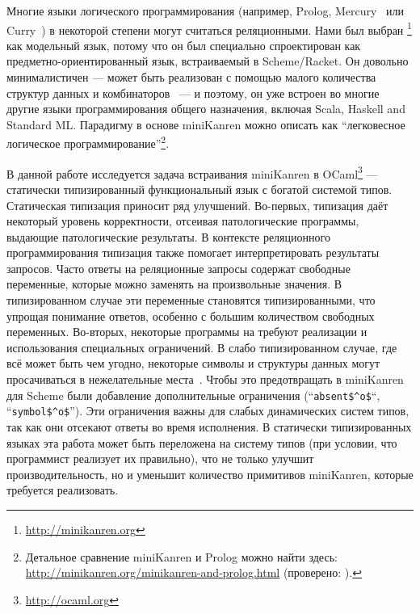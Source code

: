 Многие языки логического программирования (например, Prolog, Mercury~\cite{MercuryFirstPaper} или Curry~\cite{CurryFirstPaper}) в некоторой степени могут считаться реляционными.
Нами был выбран \miniKanren\footnote{\url{http://minikanren.org}} как модельный язык, потому что он был специально спроектирован как предметно-ориенти\-рованный язык, встраиваемый в Scheme/Racket.
Он довольно минималистичен --- может быть реализован с помощью малого количества структур данных и комбинаторов~\cite{MicroKanren, MuKanrenNew} --- и поэтому, он уже встроен во многие другие языки программирования общего назначения, включая Scala, Haskell and Standard ML.
Парадигму в основе miniKanren можно описать как \enquote{легковесное логическое программирование}\footnote{Детальное сравнение miniKanren и Prolog можно найти здесь: \url{http://minikanren.org/minikanren-and-prolog.html} (проверено: ).}.

В данной работе исследуется задача встраивания miniKanren в OCaml\footnote{\url{http://ocaml.org}} --- статически типизированный функциональный язык с богатой системой типов.
Статическая типизация приносит ряд улучшений.
Во-первых, типизация даёт некоторый уровень корректности, отсеивая патологические программы, выдающие патологические результаты.
В контексте реляционного программирования типизация также помогает интерпретировать результаты запросов.
Часто ответы на реляционные запросы содержат свободные переменные, которые можно заменять на произвольные значения.
В типизированном случае эти переменные становятся типизированными, что упрощая понимание ответов, особенно с большим количеством свободных переменных.
Во-вторых, некоторые программы на \miniKanren{} требуют реализации и использования специальных ограничений.
В слабо типизированном случае, где всё может быть чем угодно, некоторые символы и структуры данных могут просачиваться в нежелательные места~\cite{Untagged}.
Чтобы это предотвращать в miniKanren для Scheme были добавление дополнительные ограничения (``\lstinline|absent$^o$|``, ``\lstinline|symbol$^o$|'').
Эти ограничения важны для слабых динамических систем типов, так как они отсекают ответы во время исполнения.
В статически типизированных языках эта работа может быть переложена на систему типов (при условии, что программист реализует их правильно), что не только улучшит производительность, но и уменьшит количество примитивов miniKanren, которые требуется реализовать.

